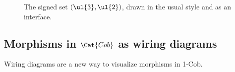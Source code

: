 \begin{figure}
\caption{The signed set $(\ul{3},\ul{2})$, drawn in the usual style and as an interface.}
\end{figure}

\subsection{Morphisms in $\Cat{Cob}$ as wiring diagrams}

Wiring diagrams are a new way to visualize morphisms in 1-Cob.
